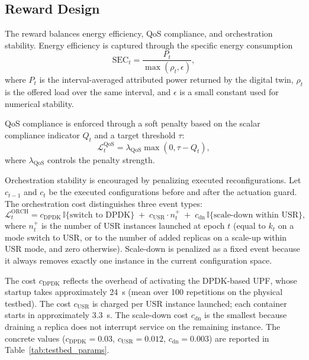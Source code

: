 \documentclass[a4paper,fleqn]{cas-sc}
\begin{document}
\subsection{Reward Design}
\label{subsec:reward}

The reward balances energy efficiency, QoS compliance, and orchestration stability. Energy efficiency is captured through the specific energy consumption
\begin{equation}
\mathrm{SEC}_t=\frac{P_t}{\max(\rho_t,\epsilon)},
\label{eq:sec}
\end{equation}
where $P_t$ is the interval-averaged attributed power returned by the digital twin, $\rho_t$ is the offered load over the same interval, and $\epsilon$ is a small constant used for numerical stability.

QoS compliance is enforced through a soft penalty based on the scalar compliance indicator $Q_t$ and a target threshold $\tau$:
\begin{equation}
\mathcal{L}^{\mathrm{QoS}}_t=\lambda_{\mathrm{QoS}}\max(0,\tau-Q_t),
\label{eq:qos_penalty}
\end{equation}
where $\lambda_{\mathrm{QoS}}$ controls the penalty strength.

Orchestration stability is encouraged by penalizing executed reconfigurations. Let $c_{t-1}$ and $c_t$ be the executed configurations before and after the actuation guard. The orchestration cost distinguishes three event types:
\begin{equation}
\mathcal{L}^{\mathrm{ORCH}}_t = c_{\mathrm{DPDK}}\,\mathbb{I}\{\text{switch to DPDK}\}
  \;+\; c_{\mathrm{USR}}\cdot n^{+}_t
  \;+\; c_{\mathrm{dn}}\,\mathbb{I}\{\text{scale-down within USR}\},
\label{eq:orch_cost}
\end{equation}
where $n^{+}_t$ is the number of USR instances launched at epoch $t$ (equal to $k_t$ on a mode switch to USR, or to the number of added replicas on a scale-up within USR mode, and zero otherwise). Scale-down is penalized as a fixed event because it always removes exactly one instance in the current configuration space.

The cost $c_{\mathrm{DPDK}}$ reflects the overhead of activating the DPDK-based UPF, whose startup takes approximately 24~s (mean over 100 repetitions on the physical testbed). The cost $c_{\mathrm{USR}}$ is charged per USR instance launched; each container starts in approximately 3.3~s. The scale-down cost $c_{\mathrm{dn}}$ is the smallest because draining a replica does not interrupt service on the remaining instance. The concrete values ($c_{\mathrm{DPDK}}=0.03$, $c_{\mathrm{USR}}=0.012$, $c_{\mathrm{dn}}=0.003$) are reported in Table~\ref{tab:testbed_params}.
\end{document}
